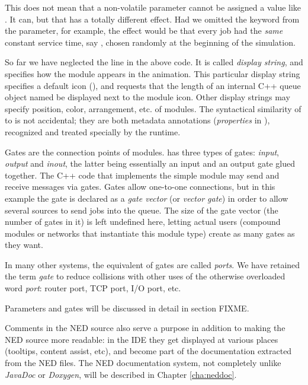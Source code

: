 \begin{note}
    This does not mean that a non-volatile parameter cannot be assigned a value
    like . It can, but that has a totally different
    effect. Had we omitted the  keyword from the
     parameter, for example, the effect would be that every
    job had the \textit{same} constant service time, say ,
    chosen randomly at the beginning of the simulation.
\end{note}

So far we have neglected the  line in the above code. It is called
\textit{display string}, and specifies how the module appears in the animation.
This particular display string specifies a default icon
(), and requests that the length of an internal C++ queue
object named  be displayed next to the module icon. Other display
strings may specify position, color, arrangement, etc. of modules. The
syntactical similarity of  to  is not accidental; they
are both metadata annotations (\textit{properties} in \opp), recognized and
treated specially by the runtime.

Gates are the connection points of modules. \opp has three types of gates:
\textit{input}, \textit{output} and \textit{inout}, the latter being essentially
an input and an output gate glued together. The C++ code that implements the
simple module may send and receive messages via gates. Gates allow one-to-one
connections, but in this example the  gate is declared as a \textit{gate
vector} (or \textit{vector gate}) in order to allow several sources to send jobs
into the queue. The size of the gate vector (the number of gates in it) is left
undefined here, letting actual users (compound modules or networks that
instantiate this module type) create as many gates as they want.

\begin{note}
    In many other systems, the equivalent of \opp gates are called
    \textit{ports}. We have retained the term \textit{gate} to reduce
    collisions with other uses of the otherwise overloaded word
    \textit{port}: router port, TCP port, I/O port, etc.
\end{note}

Parameters and gates will be discussed in detail in section FIXME.

Comments in the NED source also serve a purpose in addition to making the
NED source more readable: in the \opp IDE they get displayed at various places (tooltips,
content assist, etc), and become part of the documentation extracted from the
NED files. The NED documentation system, not completely unlike \textit{JavaDoc}
or \textit{Doxygen}, will be described in Chapter \ref{cha:neddoc}.


